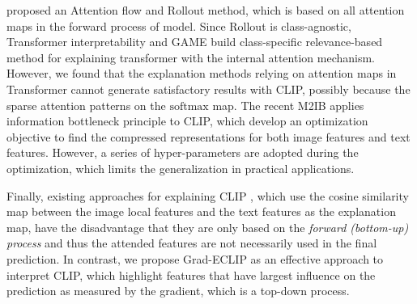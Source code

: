  \cite{abnar2020quantifying} proposed an Attention flow and Rollout method, which is based on all attention maps in the forward process of model. Since Rollout is class-agnostic, Transformer interpretability \cite{chefer2021transformer} and GAME \cite{chefer2021generic} build class-specific relevance-based method for explaining transformer with the internal attention mechanism. However, we found that the explanation methods relying on attention maps in Transformer cannot generate satisfactory results with CLIP, possibly because the sparse attention patterns on the $\mathrm{softmax}$ map.
The recent M2IB \cite{wang2024visual} applies information bottleneck principle to CLIP, which develop an optimization objective to find the compressed representations for both image features and text features. However, a series of hyper-parameters are adopted during the optimization, which limits the generalization in practical applications.

Finally, existing approaches for explaining CLIP \cite{li2022exploring, li2023clipsurgery, zhou2022extract}, 
which use the cosine similarity map between the image local features and the text features as the explanation map, have the disadvantage that they are only based on the \emph{forward (bottom-up) process} and thus the attended features are not necessarily used in the final prediction. In contrast, we propose Grad-ECLIP as an effective approach to interpret CLIP, which highlight features that have largest influence on the prediction as measured by the gradient, which is a top-down process.


\vspace{-0.1cm}
\subsection{}

